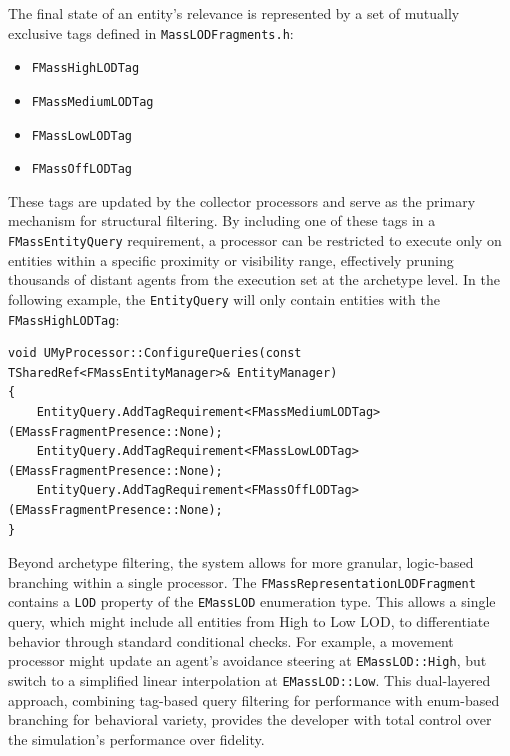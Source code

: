 The final state of an entity's relevance is represented by a set of mutually exclusive tags defined in \texttt{MassLODFragments.h}: 
\begin{itemize}
    \item \texttt{FMassHighLODTag}
    \item \texttt{FMassMediumLODTag}
    \item \texttt{FMassLowLODTag}
    \item \texttt{FMassOffLODTag}
\end{itemize}
These tags are updated by the collector processors and serve as the primary mechanism for structural filtering. By including one of these tags in a \texttt{FMassEntityQuery} requirement, a processor can be restricted to execute only on entities within a specific proximity or visibility range, effectively pruning thousands of distant agents from the execution set at the archetype level. In the following example, the \texttt{EntityQuery} will only contain entities with the \texttt{FMassHighLODTag}:

\begin{lstlisting}
void UMyProcessor::ConfigureQueries(const TSharedRef<FMassEntityManager>& EntityManager)
{
	EntityQuery.AddTagRequirement<FMassMediumLODTag>(EMassFragmentPresence::None);
	EntityQuery.AddTagRequirement<FMassLowLODTag>(EMassFragmentPresence::None);
	EntityQuery.AddTagRequirement<FMassOffLODTag>(EMassFragmentPresence::None);
}

\end{lstlisting}

Beyond archetype filtering, the system allows for more granular, logic-based branching within a single processor. The \texttt{FMassRepresentationLODFragment} contains a \texttt{LOD} property of the \texttt{EMassLOD} enumeration type. This allows a single query, which might include all entities from High to Low LOD, to differentiate behavior through standard conditional checks. For example, a movement processor might update an agent's avoidance steering at \texttt{EMassLOD::High}, but switch to a simplified linear interpolation at \texttt{EMassLOD::Low}. This dual-layered approach, combining tag-based query filtering for performance with enum-based branching for behavioral variety, provides the developer with total control over the simulation's performance over fidelity.

